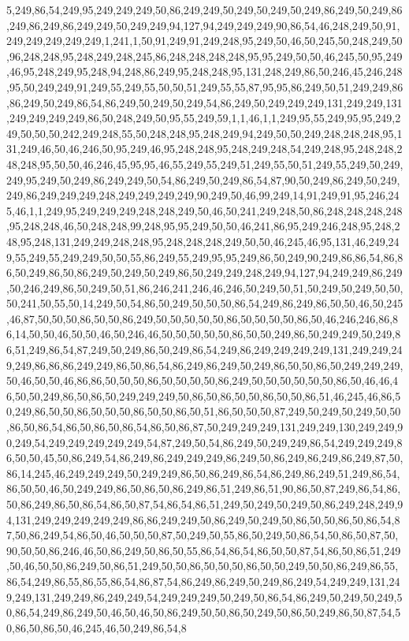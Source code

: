 5,249,86,54,249,95,249,249,249,50,86,249,249,50,249,50,249,50,249,86,249,50,249,86,249,86,249,86,249,249,50,249,249,94,127,94,249,249,249,90,86,54,46,248,249,50,91,249,249,249,249,249,1,241,1,50,91,249,91,249,248,95,249,50,46,50,245,50,248,249,50,96,248,248,95,248,249,248,245,86,248,248,248,248,95,95,249,50,50,46,245,50,95,249,46,95,248,249,95,248,94,248,86,249,95,248,248,95,131,248,249,86,50,246,45,246,248,95,50,249,249,91,249,55,249,55,50,50,51,249,55,55,87,95,95,86,249,50,51,249,249,86,86,249,50,249,86,54,86,249,50,249,50,249,54,86,249,50,249,249,249,131,249,249,131,249,249,249,249,86,50,248,249,50,95,55,249,59,1,1,46,1,1,249,95,55,249,95,95,249,249,50,50,50,242,249,248,55,50,248,248,95,248,249,94,249,50,50,249,248,248,248,95,131,249,46,50,46,246,50,95,249,46,95,248,248,95,248,249,248,54,249,248,95,248,248,248,248,95,50,50,46,246,45,95,95,46,55,249,55,249,51,249,55,50,51,249,55,249,50,249,249,95,249,50,249,86,249,249,50,54,86,249,50,249,86,54,87,90,50,249,86,249,50,249,249,86,249,249,249,248,249,249,249,249,90,249,50,46,99,249,14,91,249,91,95,246,245,46,1,1,249,95,249,249,249,248,248,249,50,46,50,241,249,248,50,86,248,248,248,248,95,248,248,46,50,248,248,99,248,95,95,249,50,50,46,241,86,95,249,246,248,95,248,248,95,248,131,249,249,248,248,95,248,248,248,249,50,50,46,245,46,95,131,46,249,249,55,249,55,249,249,50,50,55,86,249,55,249,95,95,249,86,50,249,90,249,86,86,54,86,86,50,249,86,50,86,249,50,249,50,249,86,50,249,249,248,249,94,127,94,249,249,86,249,50,246,249,86,50,249,50,51,86,246,241,246,46,246,50,249,50,51,50,249,50,249,50,50,50,241,50,55,50,14,249,50,54,86,50,249,50,50,50,86,54,249,86,249,86,50,50,46,50,245,46,87,50,50,50,86,50,50,86,249,50,50,50,50,50,86,50,50,50,50,86,50,46,246,246,86,86,14,50,50,46,50,50,46,50,246,46,50,50,50,50,50,86,50,50,249,86,50,249,249,50,249,86,51,249,86,54,87,249,50,249,86,50,249,86,54,249,86,249,249,249,249,131,249,249,249,249,86,86,86,249,249,86,50,86,54,86,249,86,249,50,249,86,50,50,86,50,249,249,249,50,46,50,50,46,86,86,50,50,50,86,50,50,50,50,86,249,50,50,50,50,50,50,86,50,46,46,46,50,50,249,86,50,86,50,249,249,249,50,86,50,86,50,50,86,50,50,86,51,46,245,46,86,50,249,86,50,50,86,50,50,50,86,50,50,86,50,51,86,50,50,50,87,249,50,249,50,249,50,50,86,50,86,54,86,50,86,50,86,54,86,50,86,87,50,249,249,249,131,249,249,130,249,249,90,249,54,249,249,249,249,249,54,87,249,50,54,86,249,50,249,249,86,54,249,249,249,86,50,50,45,50,86,249,54,86,249,86,249,249,249,86,249,50,86,249,86,249,86,249,87,50,86,14,245,46,249,249,249,50,249,249,86,50,86,249,86,54,86,249,86,249,51,249,86,54,86,50,50,46,50,249,249,86,50,86,50,86,249,86,51,249,86,51,90,86,50,87,249,86,54,86,50,86,249,86,50,86,54,86,50,87,54,86,54,86,51,249,50,249,50,249,50,86,249,248,249,94,131,249,249,249,249,249,86,86,249,249,50,86,249,50,249,50,86,50,50,86,50,86,54,87,50,86,249,54,86,50,46,50,50,50,87,50,249,50,55,86,50,249,50,86,54,50,86,50,87,50,90,50,50,86,246,46,50,86,249,50,86,50,55,86,54,86,54,86,50,50,87,54,86,50,86,51,249,50,46,50,50,86,249,50,86,51,249,50,50,86,50,50,50,86,50,50,249,50,50,86,249,86,55,86,54,249,86,55,86,55,86,54,86,87,54,86,249,86,249,50,249,86,249,54,249,249,131,249,249,131,249,249,86,249,249,54,249,249,249,50,249,50,86,54,86,249,50,249,50,249,50,86,54,249,86,249,50,46,50,46,50,86,249,50,50,86,50,249,50,86,50,249,86,50,87,54,50,86,50,86,50,46,245,46,50,249,86,54,8